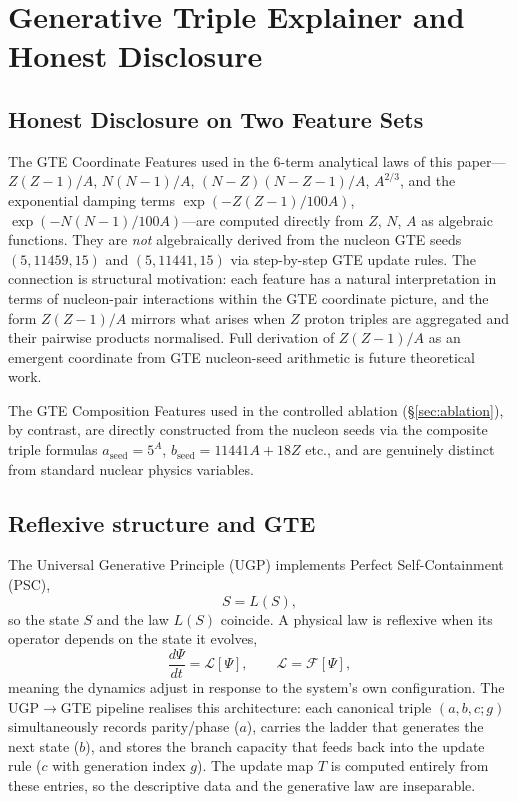 \documentclass[9pt,twocolumn]{extarticle}
\begin{document}
\section{Generative Triple Explainer and Honest Disclosure}
\label{app:gte-disclosure}

\subsection{Honest Disclosure on Two Feature Sets}
The GTE Coordinate Features used in the 6-term analytical laws of this paper---$Z(Z-1)/A$, $N(N-1)/A$, $(N-Z)(N-Z-1)/A$, $A^{2/3}$, and the exponential damping terms $\exp(-Z(Z-1)/100A)$, $\exp(-N(N-1)/100A)$---are computed directly from $Z$, $N$, $A$ as algebraic functions. They are \emph{not} algebraically derived from the nucleon GTE seeds $(5,11459,15)$ and $(5,11441,15)$ via step-by-step GTE update rules. The connection is structural motivation: each feature has a natural interpretation in terms of nucleon-pair interactions within the GTE coordinate picture, and the form $Z(Z-1)/A$ mirrors what arises when $Z$ proton triples are aggregated and their pairwise products normalised. Full derivation of $Z(Z-1)/A$ as an emergent coordinate from GTE nucleon-seed arithmetic is future theoretical work.

The GTE Composition Features used in the controlled ablation (\S\ref{sec:ablation}), by contrast, are directly constructed from the nucleon seeds via the composite triple formulas $a_\mathrm{seed}=5^A$, $b_\mathrm{seed}=11441A+18Z$ etc., and are genuinely distinct from standard nuclear physics variables.

\subsection{Reflexive structure and GTE}
The Universal Generative Principle (UGP) implements Perfect Self-Containment (PSC),
\[
S = L(S),
\]
so the state $S$ and the law $L(S)$ coincide. A physical law is reflexive when its operator depends on the state it evolves,
\[
\frac{d\Psi}{dt} = \mathcal{L}[\Psi], \qquad \mathcal{L} = \mathcal{F}[\Psi],
\]
meaning the dynamics adjust in response to the system’s own configuration. The UGP$\rightarrow$GTE pipeline realises this architecture: each canonical triple $(a,b,c;g)$ simultaneously records parity/phase ($a$), carries the ladder that generates the next state ($b$), and stores the branch capacity that feeds back into the update rule ($c$ with generation index $g$). The update map $T$ is computed entirely from these entries, so the descriptive data and the generative law are inseparable.
\end{document}
